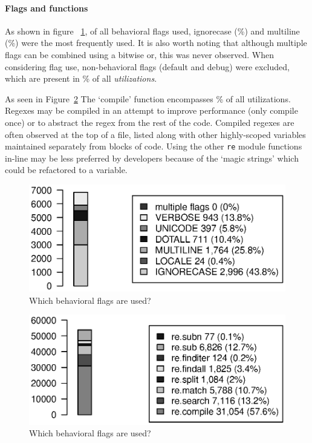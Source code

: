 

\pagebreak
\paragraph{Flags and functions}
\label{sec:flagsAndFunctions} As shown in figure ~\ref{fig:partFlags}, of all behavioral flags used, ignorecase (\%) and multiline (\%) were the most frequently used.  It is also worth noting that although multiple flags can be combined using a bitwise or, this was never observed.
When considering flag use, non-behavioral flags (default and debug) were excluded, which are present in \% of all \emph{utilizations}.

As seen in Figure~\ref{fig:partFunctions} The `compile' function encompasses \% of all utilizations.  Regexes may be compiled in an attempt to improve performance (only compile once) or to abstract the regex from the rest of the code.  Compiled regexes are often observed at the top of a file, listed along with other highly-scoped variables maintained separately from blocks of code.  Using the other {\tt re} module functions in-line may be less preferred by developers because of the `magic strings' which could be refactored to a variable.

\begin{figure}[ht]
\centering
  \centering
  \includegraphics[width=.72\textwidth]{nontex/illustrations/partFlags.eps}
  \caption{Which behavioral flags are used?}
  \vspace{-6pt}
\label{fig:partFlags}
\end{figure}

\begin{figure}[ht]
\centering
  \centering
  \includegraphics[width=.70\textwidth]{nontex/illustrations/partFunctions.eps}
  \caption{Which behavioral flags are used?}
  \vspace{-6pt}
\label{fig:partFunctions}
\end{figure}
